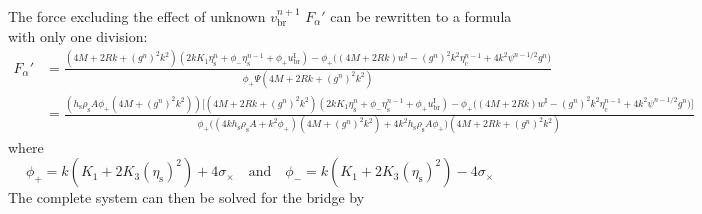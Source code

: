\documentclass{article}
\begin{document}
The force excluding the effect of unknown $v_\text{br}^{n+1}$ $F_\alpha'$ can be rewritten to a formula with only one division:
\begin{align}
    F_\alpha' &= \frac{(4M+2Rk + (g^n)^2k^2)(2kK_1\eta_\text{s}^n+\phi_-\eta_\text{s}^{n-1} +\phi_+u^\text{I}_\text{br}) - \phi_+\Big((4M+2Rk)w^\text{I} - (g^n)^2k^2\eta_\text{c}^{n-1} + 4k^2\psi^{n-1/2}g^n\Big)}{\phi_+\Psi(4M+2Rk + (g^n)^2k^2)}\\
    &\!\!\!\!\!\!\!\!\!\!\!\!\!\!\!\!\!\!\!\!\!\!\!\!\!\!\!\!\!\!\!\!\!\!\!\!\!\!\!\!\!\!\!\!\!\!\!\!\!\!\!\!\!\!\!\!= \frac{(h_\text{s}\rho_\text{s}A\phi_+(4M+(g^n)^2k^2))\Big[(4M+2Rk+(g^n)^2k^2)(2kK_1\eta_\text{s}^n+\phi_-\eta_\text{s}^{n-1}+\phi_+u_\text{br}^\text{I})-\phi_+\Big((4M+2Rk)w^\text{I}-(g^n)^2k^2\eta_\text{c}^{n-1}+4k^2\psi^{n-1/2}g^n\Big)\Big]}{\phi_+\Big((4kh_\text{s}\rho_\text{s}A+k^2\phi_+)(4M+(g^n)^2k^2)+4k^2h_\text{s}\rho_\text{s}A\phi_+\Big)(4M + 2Rk + (g^n)^2k^2)}
\end{align}
where 
\begin{equation}
    \phi_+ = k (K_1 + 2 K_3 (\eta_\text{s})^2) + 4 \sigma_\times \quad \text{and} \quad \phi_- = k (K_1 + 2 K_3 (\eta_\text{s})^2) - 4 \sigma_\times
\end{equation}
The complete system can then be solved for the bridge by
\end{document}
